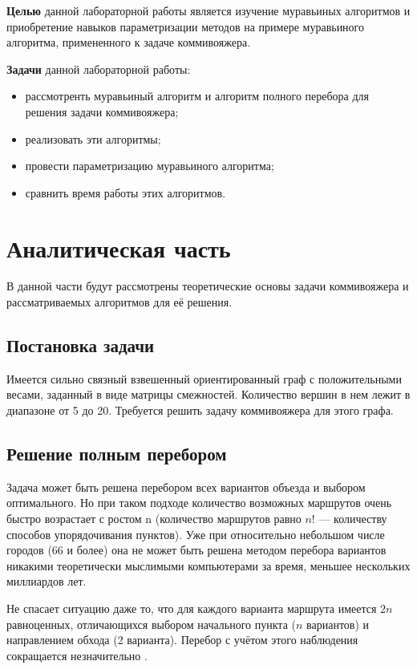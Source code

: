 \documentclass[12pt]{report}
\begin{document}
        
\textbf{Целью} данной лабораторной работы является изучение муравьиных алгоритмов и приобретение навыков параметризации методов на примере муравьиного алгоритма, примененного к задаче коммивояжера.
        
\textbf{Задачи} данной лабораторной работы:
\begin{itemize}
	\item рассмотренть муравьиный алгоритм и алгоритм полного перебора для решения задачи коммивояжера;
	\item реализовать эти алгоритмы;
	\item провести параметризацию муравьиного алгоритма;
	\item сравнить время работы этих алгоритмов.
\end{itemize}



\chapter{Аналитическая часть}
В данной части будут рассмотрены теоретические основы задачи коммивояжера и рассматриваемых алгоритмов для её решения. 
		
\section{Постановка задачи} 
Имеется сильно связный взвешенный ориентированный граф \cite{diskr} с положительными весами, заданный в виде матрицы смежностей. Количество вершин в нем лежит в диапазоне от 5 до 20. Требуется решить задачу коммивояжера для этого графа. 

\section{Решение полным перебором}
Задача может быть решена перебором всех вариантов объезда и выбором оптимального. Но при таком подходе количество возможных маршрутов очень быстро возрастает с ростом n (количество маршрутов равно $n!$ — количеству способов упорядочивания пунктов). Уже при относительно небольшом числе городов (66 и более) она не может быть решена методом перебора вариантов никакими теоретически мыслимыми компьютерами за время, меньшее нескольких миллиардов лет. 

Не спасает ситуацию даже то, что для каждого варианта маршрута имеется $2n$ равноценных, отличающихся выбором начального пункта ($n$ вариантов) и направлением обхода (2 варианта). Перебор с учётом этого наблюдения сокращается незначительно \cite{commi2}.	
\end{document}

